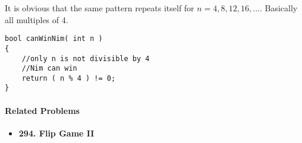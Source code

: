 It is obvious that the same pattern repeats itself for $n=4,8,12,16,\dots$. Basically all multiples of 4.

\setcounter{lstlisting}{0}
\begin{lstlisting}[style=customc, caption={Induction}]
bool canWinNim( int n )
{
    //only n is not divisible by 4
    //Nim can win
    return ( n % 4 ) != 0;
}
\end{lstlisting}

\paragraph{Related Problems}
\begin{itemize}
\item \textbf{294. Flip Game II}
\end{itemize}
